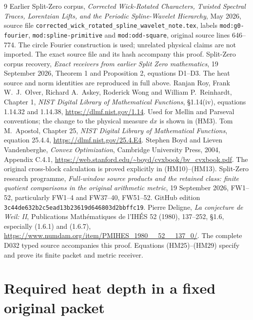 \documentclass[11pt]{article}
\begin{document}
\begin{thebibliography}{9}
\small
{} Earlier Split-Zero corpus,
\emph{Corrected Wick-Rotated Characters, Twisted Spectral Traces,
Lorentzian Lifts, and the Periodic Spline-Wavelet Hierarchy}, May 2026,
source file
\texttt{corrected\_wick\_rotated\_spline\_wavelet\_note.tex},
labels \texttt{mod:g0-fourier}, \texttt{mod:spline-primitive} and
\texttt{mod:odd-square}, original source lines 646--774.
The circle Fourier construction is used; unrelated physical claims are
not imported. The exact source file and its hash accompany this proof.
 Split-Zero corpus recovery,
\emph{Exact receivers from earlier Split Zero mathematics},
19 September 2026, Theorem 1 and Proposition 2, equations D1--D3.
The heat source and norm identities are reproduced in full above.
 Ranjan Roy, Frank W.~J.~Olver, Richard A.~Askey,
Roderick Wong and William P.~Reinhardt, Chapter 1,
\emph{NIST Digital Library of Mathematical Functions},
\S1.14(iv), equations 1.14.32 and 1.14.38,
\url{https://dlmf.nist.gov/1.14}.
Used for Mellin and Parseval conventions; the change to the physical
measure $dx$ is shown in (HM3).
 Tom M.~Apostol, Chapter 25,
\emph{NIST Digital Library of Mathematical Functions}, equation 25.4.4,
\url{https://dlmf.nist.gov/25.4.E4}.
 Stephen Boyd and Lieven Vandenberghe,
\emph{Convex Optimization}, Cambridge University Press, 2004,
Appendix C.4.1,
\url{https://web.stanford.edu/~boyd/cvxbook/bv_cvxbook.pdf}.
The original cross-block calculation is proved explicitly in (HM10)--(HM13).
 Split-Zero research programme,
\emph{Full-window source products and the retained class: finite quotient
comparisons in the original arithmetic metric}, 19 September 2026,
FW1--52, particularly FW1--4 and FW37--40, FW51--52.
GitHub edition \texttt{3c44de632b2c5ead13b23619d646803d2bbffc19}.
 Pierre Deligne, \emph{La conjecture de Weil: II},
Publications Math\'ematiques de l'IH\'ES 52 (1980), 137--252,
\S1.6, especially (1.6.1) and (1.6.7),
\url{https://www.numdam.org/item/PMIHES_1980__52__137_0/}.
The complete D032 typed source accompanies this proof. Equations
(HM25)--(HM29) specify and prove its finite packet and metric receiver.
\end{thebibliography}

\endgroup

\clearpage
\begingroup
\def\C{\mathbb C}
\def\R{\mathbb R}
\def\norm#1{\left\lVert#1\right\rVert}
\section*{Required heat depth in a fixed original packet}
\end{document}
